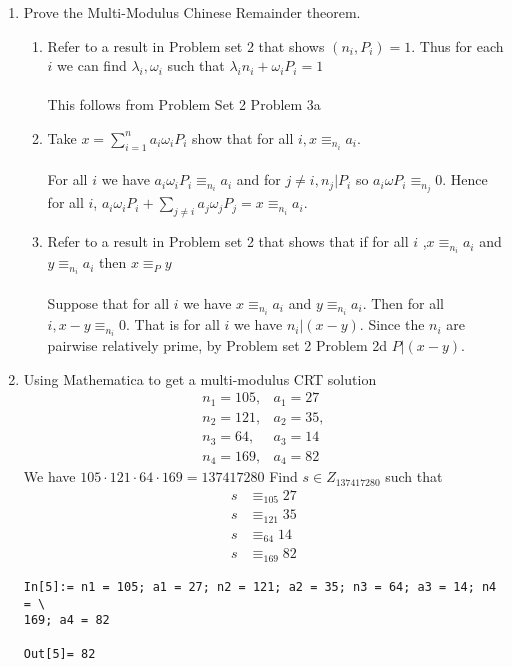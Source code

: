 \documentclass[12pt]{amsart}
\newcommand{\benu}{\begin{enumerate}}
\newcommand{\eenu}{\end{enumerate}}
\theoremstyle{definition}
\begin{document}
\begin{enumerate}
\item Prove the Multi-Modulus Chinese Remainder theorem.
 
\benu 
\item Refer to a result in Problem set 2 that shows $(n_i,P_i)=1$. Thus for each $i$ we can find $\lambda_i,\omega_i$ such that $\lambda_in_i+\omega_iP_i=1$
\\
\\
This follows from Problem Set 2 Problem 3a
\\
\item
Take $x=\sum_{i=1}^na_i\omega_iP_i$ show that for all $i, x\equiv_{n_i}a_i$.
\\\\
For all $i$ we have  $a_i\omega_iP_i\equiv_{n_i} a_i$ and for $j\neq i,n_j|P_i$ so $a_i\omega P_i\equiv_{n_j}0$. Hence for all $i$, $a_i\omega_{i}P_i+\sum_{j\neq i}a_j\omega_jP_j=x\equiv_{n_i} a_i$.
\\
\item Refer to a result in Problem set 2 that shows that if for all $i$ ,$x\equiv_{n_i}a_i$ and $y\equiv_{n_i} a_i$ then $x\equiv_P y$
\\\\
Suppose that for all $i$ we have $x\equiv_{n_i}a_i$ and $y\equiv_{n_i} a_i$. Then for all $i, x-y\equiv_{n_i}0$. That is for all $i$ we have $n_i|(x-y)$. Since the $n_i$ are pairwise relatively prime, by Problem set 2 Problem 2d $P|(x-y)$.

\eenu

\newpage %
\item Using Mathematica to get a multi-modulus CRT solution
\begin{align*}
n_1=105,&a_1=27\\
n_2=121,&a_2=35,\\
n_3=64,&a_3=14\\
n_4=169,&a_4=82
\end{align*}
We have $105\cdot121\cdot 64\cdot 169=137417280$
Find $s \in Z_{137417280}$ such that 
\begin{align*} 
s &\equiv_{105} 27\\
s &\equiv_{121}35\\
s &\equiv_{64} 14\\
s&\equiv_{169}82
\end{align*}

\begin{verbatim}
In[5]:= n1 = 105; a1 = 27; n2 = 121; a2 = 35; n3 = 64; a3 = 14; n4 = \
169; a4 = 82

Out[5]= 82


\end{verbatim}
\end{enumerate}
\end{document}
